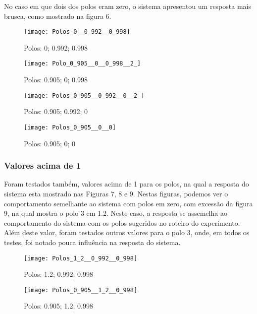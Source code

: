 \documentclass[a4paper,12pt]{article}
\begin{document}
No caso em que dois dos polos eram zero, o sistema apresentou um resposta mais brusca, como mostrado na figura 6.

\begin{figure}[h!]
\texttt{[image: Polos\_0\_\_0\_992\_\_0\_998]}
\caption{Polos: 0; 0.992; 0.998}
\end{figure}

\begin{figure}[h!]
\texttt{[image: Polo\_0\_905\_\_0\_\_0\_998\_\_2\_]}
\caption{Polos: 0.905; 0; 0.998}
\end{figure}

\newpage

\thispagestyle{main}

\begin{figure}[h!]
\texttt{[image: Polos\_0\_905\_\_0\_992\_\_0\_\_2\_]}
\caption{Polos: 0.905; 0.992; 0}
\end{figure}

\begin{figure}[h!]
\texttt{[image: Polos\_0\_905\_\_0\_\_0]}
\caption{Polos: 0.905; 0; 0}
\end{figure}

\newpage

\thispagestyle{main}

\subsubsection{Valores acima de 1}

\hspace{4ex}Foram testados também, valores acima de 1 para os polos, na qual a resposta do sistema esta mostrado nas Figuras 7, 8 e 9. Nestas figuras, podemos ver o comportamento semelhante ao sistema com polos em zero, com excessão da figura 9, na qual mostra o polo 3 em 1.2. Neste caso, a resposta se assemelha ao comportamento do sistema com os polos sugeridos no roteiro do experimento. 
Além deste valor, foram testados outros valores para o polo 3, onde, em todos os testes, foi notado pouca influência na resposta do sistema.

\begin{figure}[h!]
\texttt{[image: Polos\_1\_2\_\_0\_992\_\_0\_998]}
\caption{Polos: 1.2; 0.992; 0.998}
\end{figure}

\begin{figure}[h!]
\texttt{[image: Polos\_0\_905\_\_1\_2\_\_0\_998]}
\caption{Polos: 0.905; 1.2; 0.998}
\end{figure}
\end{document}
